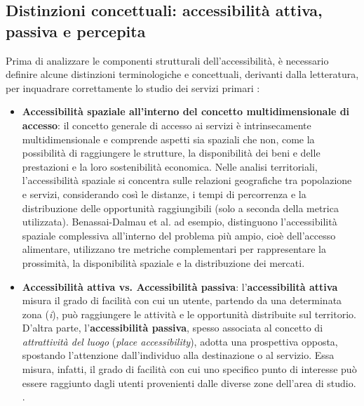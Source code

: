 \subsection{Distinzioni concettuali: accessibilità attiva, passiva e percepita}

Prima di analizzare le componenti strutturali dell'accessibilità, è necessario definire alcune distinzioni terminologiche e concettuali, derivanti dalla letteratura, per inquadrare correttamente lo studio dei servizi primari \cite{mazzulla2024, benassai2026}:
\begin{itemize}
    \item \textbf{Accessibilità spaziale all'interno del concetto multidimensionale di accesso}: il concetto generale di accesso ai servizi è intrinsecamente multidimensionale e comprende aspetti sia spaziali che non, come la possibilità di raggiungere le strutture, la disponibilità dei beni e delle prestazioni e la loro sostenibilità economica.
    Nelle analisi territoriali, l'accessibilità spaziale si concentra sulle relazioni geografiche tra popolazione e servizi, considerando così le distanze, i tempi di percorrenza e la distribuzione delle opportunità raggiungibili (solo a seconda della metrica utilizzata). Benassai-Dalmau et al. ad esempio, distinguono l'accessibilità spaziale complessiva all'interno del problema più ampio, cioè dell'accesso alimentare, utilizzano tre metriche complementari per rappresentare la prossimità, la disponibilità spaziale e la distribuzione dei mercati.
    
    
    
    \item \textbf{Accessibilità attiva vs. Accessibilità passiva}: l'\textbf{accessibilità attiva} misura il grado di facilità con cui un utente, partendo da una determinata zona (\textit{i}), può raggiungere le attività e le opportunità distribuite sul territorio.
    D'altra parte, l'\textbf{accessibilità passiva}, spesso associata al concetto di \textit{attrattività del luogo} (\textit{place accessibility}), adotta una prospettiva opposta, spostando l'attenzione dall'individuo alla destinazione o al servizio. Essa misura, infatti, il grado di facilità con cui uno specifico punto di interesse può essere raggiunto dagli utenti provenienti dalle diverse zone dell'area di studio. \cite{mazzulla2024}. 
   

\end{itemize}
